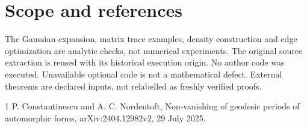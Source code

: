\documentclass[10pt]{article}
\begin{document}
\section*{Scope and references}
The Gaussian expansion, matrix trace examples, density construction and edge optimization are analytic checks, not numerical experiments. The original source extraction is reused with its historical execution origin. No author code was executed. Unavailable optional code is not a mathematical defect. External theorems are declared inputs, not relabelled as freshly verified proofs.\par
1 P. Constantinescu and A. C. Nordentoft, Non-vanishing of geodesic periods of automorphic forms, arXiv:2404.12982v2, 29 July 2025.\par
\end{document}
